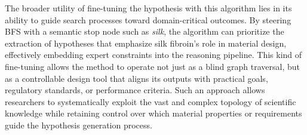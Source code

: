 The broader utility of fine-tuning the hypothesis with this algorithm lies in its ability to guide search processes toward domain-critical outcomes. By steering BFS with a semantic stop node such as \textit{silk}, the algorithm can prioritize the extraction of hypotheses that emphasize silk fibroin’s role in material design, effectively embedding expert constraints into the reasoning pipeline. This kind of fine-tuning allows the method to operate not just as a blind graph traversal, but as a controllable design tool that aligns its outputs with practical goals, regulatory standards, or performance criteria. Such an approach allows researchers to systematically exploit the vast and complex topology of scientific knowledge while retaining control over which material properties or requirements guide the hypothesis generation process.

